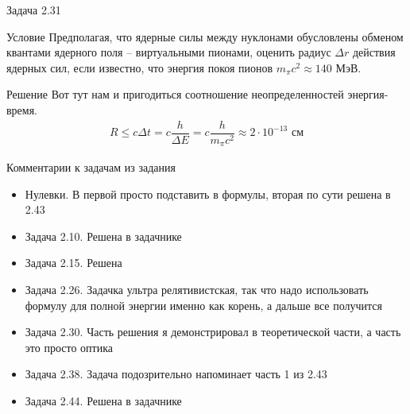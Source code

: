 \documentclass[12]{beamer}
\begin{document}
\begin{frame}{Задача 2.31}\scriptsize
\begin{block}{Условие}
Предполагая, что ядерные силы между нуклонами обусловлены обменом квантами ядерного поля -- виртуальными пионами, оценить радиус $\Delta r$ действия ядерных сил, если известно, что энергия покоя пионов $m_{\pi}c^2 \approx 140$ МэВ.
\end{block}
\begin{block}{Решение}
Вот тут нам и пригодиться соотношение неопределенностей энергия-время. 
\begin{gather*}
    R \le c\Delta t = c\dfrac{h}{\Delta E} = c\dfrac{h}{m_{\pi}c^2}\approx 2\cdot 10^{-13} \text{ см}
\end{gather*}
\end{block}
\end{frame}



\begin{frame}[t]{Комментарии к задачам из задания}\scriptsize
\begin{itemize}
\item Нулевки. В первой просто подставить в формулы, вторая по сути решена в 2.43
\item Задача 2.10. Решена в задачнике
\item Задача 2.15. Решена
\item Задача 2.26. Задачка ультра релятивистская, так что надо использовать формулу для полной энергии именно как корень, а дальше все получится
\item Задача 2.30. Часть решения я демонстрировал в теоретической части, а часть это просто оптика
\item Задача 2.38. Задача подозрительно напоминает часть 1 из 2.43
\item Задача 2.44. Решена в задачнике
\end{itemize}
\end{frame}
\end{document}
